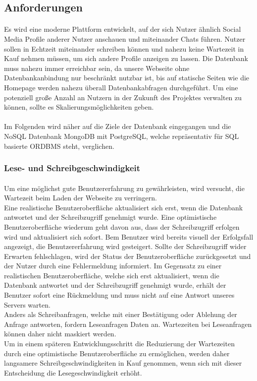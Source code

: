 \subsection{Anforderungen}
\paragraph{}
Es wird eine moderne Plattform entwickelt, auf der sich Nutzer ähnlich Social Media Profile anderer Nutzer anschauen und miteinander Chats führen.
Nutzer sollen in Echtzeit miteinander schreiben können und nahezu keine Wartezeit in Kauf nehmen müssen, um sich andere Profile anzeigen zu lassen.
Die Datenbank muss nahezu immer erreichbar sein, da unsere Webseite ohne Datenbankanbindung nur beschränkt nutzbar ist, bis auf statische Seiten wie die Homepage werden nahezu überall Datenbankabfragen durchgeführt.
Um eine potenziell große Anzahl an Nutzern in der Zukunft des Projektes verwalten zu können, sollte es Skalierungsmöglichkeiten geben.

\paragraph{}
Im Folgenden wird näher auf die Ziele der Datenbank eingegangen und die NoSQL Datenbank MongoDB mit PostgreSQL, welche repräsentativ für SQL basierte ORDBMS steht, verglichen. 

\subsubsection{Lese- und Schreibgeschwindigkeit}
\paragraph{}
Um eine möglichst gute Benutzererfahrung zu gewährleisten, wird versucht, die Wartezeit beim Laden der Webseite zu verringern.\\
Eine realistische Benutzeroberfläche aktualisiert sich erst, wenn die Datenbank antwortet und der Schreibzugriff genehmigt wurde.
Eine optimistische Benutzeroberfläche wiederum geht davon aus, dass der Schreibzugriff erfolgen wird und aktualisiert sich sofort.
Bem Benutzer wird bereits visuell der Erfolgsfall angezeigt, die Benutzererfahrung wird gesteigert.
Sollte der Schreibzugriff wider Erwarten fehlschlagen, wird der Status der Benutzeroberfläche zurückgesetzt und der Nutzer durch eine Fehlermeldung informiert.
Im Gegensatz zu einer realistischen Benutzeroberfläche, welche sich erst aktualisiert, wenn die Datenbank antwortet und der Schreibzugriff genehmigt wurde, erhält der Benutzer sofort eine Rückmeldung und muss nicht auf eine Antwort unseres Servers warten.\\
Anders als Schreibanfragen, welche mit einer Bestätigung oder Ablehung der Anfrage antworten, fordern Leseanfragen Daten an.
Wartezeiten bei Leseanfragen können daher nicht maskiert werden.\\
Um in einem späteren Entwicklungsschritt die Reduzierung der Wartezeiten durch eine optimistische Benutzeroberfläche zu ermöglichen, werden daher langsamere Schreibgeschwindigkeiten in Kauf genommen, wenn sich mit dieser Entscheidung die Lesegeschwindigkeit erhöht.

